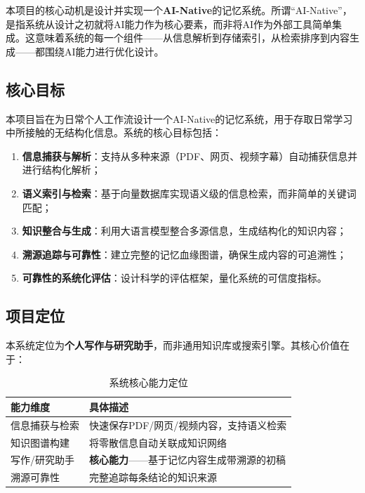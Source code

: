 \documentclass[12pt,a4paper,oneside]{article}
\begin{document}
本项目的核心动机是设计并实现一个\textbf{AI-Native}的记忆系统。所谓“AI-Native”，是指系统从设计之初就将AI能力作为核心要素，而非将AI作为外部工具简单集成。这意味着系统的每一个组件——从信息解析到存储索引，从检索排序到内容生成——都围绕AI能力进行优化设计。

\subsection{核心目标}

本项目旨在为日常个人工作流设计一个AI-Native的记忆系统，用于存取日常学习中所接触的无结构化信息。系统的核心目标包括：

\begin{enumerate}[\arabic*)]
    \item \textbf{信息捕获与解析}：支持从多种来源（PDF、网页、视频字幕）自动捕获信息并进行结构化解析；
    \item \textbf{语义索引与检索}：基于向量数据库实现语义级的信息检索，而非简单的关键词匹配；
    \item \textbf{知识整合与生成}：利用大语言模型整合多源信息，生成结构化的知识内容；
    \item \textbf{溯源追踪与可靠性}：建立完整的记忆血缘图谱，确保生成内容的可追溯性；
    \item \textbf{可靠性的系统化评估}：设计科学的评估框架，量化系统的可信度指标。
\end{enumerate}

\subsection{项目定位}

本系统定位为\textbf{个人写作与研究助手}，而非通用知识库或搜索引擎。其核心价值在于：

\begin{table}[h]
    \centering
    \caption{系统核心能力定位}
    \begin{tabular}{p{4cm}p{6cm}}
        \toprule
        \textbf{能力维度} & \textbf{具体描述} \\
        \midrule
        信息捕获与检索 & 快速保存PDF/网页/视频内容，支持语义检索 \\
        知识图谱构建 & 将零散信息自动关联成知识网络 \\
        写作/研究助手 & \textbf{核心能力}——基于记忆内容生成带溯源的初稿 \\
        溯源可靠性 & 完整追踪每条结论的知识来源 \\
        \bottomrule
    \end{tabular}
\end{table}
\end{document}
